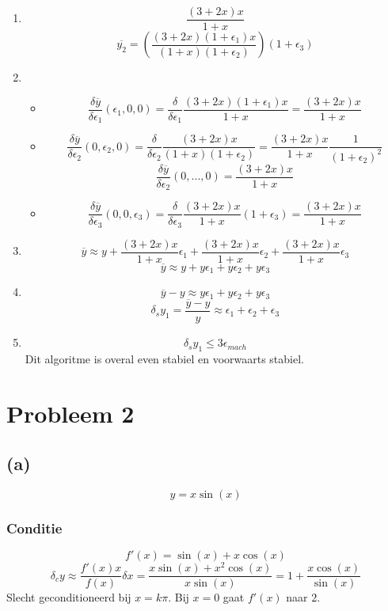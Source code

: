 \documentclass[12pt,a4paper]{article}
\begin{document}
\begin{enumerate}
\item
\[
\frac{(3+2x)x}{1+x}
\]
\[
\overline{y_2} = \left(\frac{(3+2x)(1+\epsilon_1)x}{(1+x)(1+\epsilon_2)}\right)(1+\epsilon_3)
\]


\item
\begin{itemize}
\item
\[
\frac{\delta\overline{y}}{\delta\epsilon_1}(\epsilon_1,0,0)
= \frac{\delta}{\delta\epsilon_1}\frac{(3+2x)(1+\epsilon_1)x}{1+x}
= \frac{(3+2x)x}{1+x}
\]

\item
\[
\frac{\delta\overline{y}}{\delta\epsilon_2}(0,\epsilon_2,0)
= \frac{\delta}{\delta\epsilon_2}\frac{(3+2x)x}{(1+x)(1+\epsilon_2)}
= \frac{(3+2x)x}{1+x}\frac{1}{(1+\epsilon_2)^2}
\]
\[
\frac{\delta\overline{y}}{\delta\epsilon_2}(0,...,0)
= \frac{(3+2x)x}{1+x}
\]

\item
\[
\frac{\delta\overline{y}}{\delta\epsilon_3}(0,0,\epsilon_3)
= \frac{\delta}{\delta\epsilon_3}\frac{(3+2x)x}{1+x}(1+\epsilon_3)
= \frac{(3+2x)x}{1+x}
\]

\end{itemize}
\item
\[
\overline{y} \approx y
+ \frac{(3+2x)x}{1+x}\epsilon_1
+ \frac{(3+2x)x}{1+x}\epsilon_2
+ \frac{(3+2x)x}{1+x}\epsilon_3
\]
\[
\overline{y} \approx y
+ y\epsilon_1
+ y\epsilon_2
+ y\epsilon_3
\]

\item
\[
\overline{y} - y
\approx
  y\epsilon_1
+ y\epsilon_2
+ y\epsilon_3
\]
\[
\delta_{s}y_1
= \frac{\overline{y} - y}{y}
\approx
  \epsilon_1
+ \epsilon_2
+ \epsilon_3
\]
\item
\[
\delta_{s}y_1 \le  3\epsilon_{mach}
\]
Dit algoritme is overal even stabiel en voorwaarts stabiel.
\end{enumerate}


\section{Probleem 2}
\subsection*{(a)}
\[
y = x\sin(x)
\]

\subsubsection*{Conditie}
\[
f'(x) = \sin(x) + x\cos(x)
\]
\[
\delta_cy \approx \frac{f'(x)x}{f(x)}\delta x
= \frac{x\sin(x) + x^2\cos(x)}{x\sin(x)}
= 1+\frac{x\cos(x)}{\sin(x)}
\]
Slecht geconditioneerd bij $x=k\pi$.
Bij $x=0$ gaat $f'(x)$ naar $2$.
\end{document}
